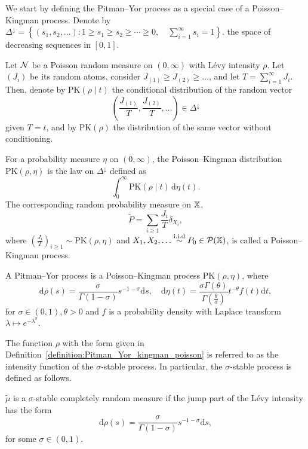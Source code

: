 We start by defining the Pitman--Yor process as a special case of a Poisson--Kingman process. Denote by 
$\Delta^\downarrow
=
\left\{
(s_1,s_2,\dots) :
1 \geq s_1 \geq s_2 \geq \cdots \geq 0,
\quad
\sum_{i=1}^{\infty} s_i = 1
\right\}.$
the space of decreasing sequences in $[0,1]$.
\begin{definition}\label{definition:Poisson_kingman}
Let $\mathcal{N}$ be a Poisson random measure on $(0,\infty)$ with L\'evy intensity $\rho$. Let $(J_i)$ be its random atoms, consider $J_{(1)} \geq J_{(2)} \geq \dots$, and let $T = \sum_{i = 1}^\infty J_i$. Then, denote by $\mathrm{PK}(\rho \mid t)$ the conditional distribution of the random vector
\[
\left( \frac{J_{(1)}}{T}, \frac{J_{(2)}}{T},\dots \right) \in \Delta^\downarrow
\]
given $T = t$, and by $\mathrm{PK}(\rho)$ the distribution of the same vector without conditioning.

For a probability measure $\eta$ on $(0,\infty)$, the Poisson--Kingman distribution $\mathrm{PK}(\rho, \eta)$ is the law on $\Delta^\downarrow$ defined as
\[
\int_0^\infty \mathrm{PK}(\rho \mid t)\,\mathrm{d}\eta(t).
\]
The corresponding random probability measure on $\mathbb{X}$,
\[
\widetilde{P} = \sum_{i \geq 1}\frac{J_i}{T}\delta_{X_i},
\]
where $\left(\frac{J_i}{T} \right)_{i \geq 1} \sim \mathrm{PK}(\rho, \eta)$ and $X_1,X_2,\dots \overset{\mathrm{i.i.d}}{\sim} P_0 \in \mathcal{P}(\mathbb{X})$, is called a Poisson--Kingman process.
\end{definition}

\begin{definition}\label{definition:Pitman_Yor_kingman_poisson}
A Pitman--Yor process is a Poisson--Kingman process $\mathrm{PK}(\rho, \eta)$, where
\[
\mathrm{d}\rho(s) = \frac{\sigma}{\Gamma(1-\sigma)}s^{-1-\sigma}\mathrm{d}s, \quad
\mathrm{d}\eta(t) = \frac{\sigma\Gamma(\theta)}{\Gamma\left(\frac{\theta}{\sigma}\right)}t^{-\theta}f(t)\mathrm{d}t,
\]
for $\sigma \in (0,1), \theta > 0$ and $f$ is a probability density with Laplace transform $\lambda \mapsto e^{-\lambda^{\sigma}}$.
\end{definition}

The function $\rho$ with the form given in Definition~\ref{definition:Pitman_Yor_kingman_poisson} is referred to as the intensity function of the $\sigma$-stable process. In particular, the $\sigma$-stable process is defined as follows.
\begin{definition}\label{definition:sigma_stable_crm}
$\tilde{\mu}$ is a $\sigma$-stable completely random measure if the jump part of the L\'evy intensity has the form
\[
\mathrm{d}\rho(s) = \frac{\sigma}{\Gamma(1-\sigma)}s^{-1-\sigma}\mathrm{d}s,
\]
for some $\sigma \in (0,1)$.
\end{definition}

